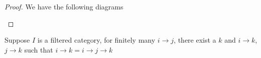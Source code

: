 \documentclass[../main.tex]{subfiles}
\begin{document}
\begin{proof}
We have the following diagrams
\begin{center}
\end{center}
\end{proof}

\begin{lemma}\label{Finitely many morphisms in a filtered category can goes to a common end}
Suppose $I$ is a filtered category, for finitely many $i\to j$, there exist a $k$ and $i\to k$, $j\to k$ such that $i\to k=i\to j\to k$
\end{lemma}
\end{document}
